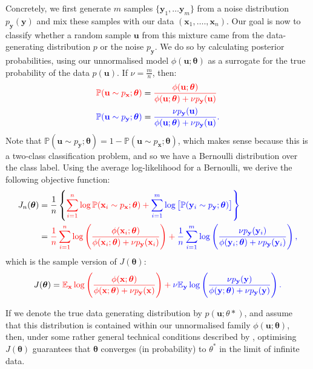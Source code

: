 \documentclass[11pt, oneside]{article}
\newcommand{\thetab}{{\boldsymbol{\theta}}}
\newcommand{\pnorm}{p}
\newcommand{\pnn}{\phi}
\newcommand{\pdata}{p_{ \mathbf x}}
\newcommand{\pnoise}{p_{ \mathbf y}}
\renewcommand{\u}{{\mathbf u}}
\newcommand{\x}{{\mathbf x}}
\newcommand{\y}{{\mathbf y}}
\renewcommand{\P}{\mathbb{P}}
\newcommand{\E}{\mathbb{E}}
\newcommand{\Ex}{\E_{\x}}
\newcommand{\Ey}{\E_{\y}}
\theoremstyle{definition}
\begin{document}
Concretely, we first generate $m$ samples $\{\textbf{y}_1, \ldots \textbf{y}_m\}$ from a noise distribution $\pnoise(\textbf{y})$ and mix these samples with our data $(\textbf{x}_1, …., \textbf{x}_n)$. Our goal is now to classify whether a random sample $\u$ from this mixture came from the data-generating distribution $p$ or the noise $\pnoise$. We do so by calculating posterior probabilities, using our unnormalised model $\phi(\u; \thetab)$ as a surrogate for the true probability of the data $p(\u)$. If $\nu = \frac{m}{n}$, then:
\begin{align}
    \color{red}{\P( \u \sim \pdata; \thetab)} &= \color{red}{\frac{\pnn(\textbf{u}; \thetab)}{\pnn(\textbf{u}; \thetab) + \nu \pnoise(\textbf{u})}} \\
    \color{blue}{\P( \u \sim \pnoise; \thetab)} &= \color{blue}{\frac{\nu \pnoise(\textbf{u})}{\pnn(\textbf{u}; \thetab) + \nu \pnoise(\textbf{u})}.}
\end{align}
Note that $\P( \u \sim \pnoise; \thetab ) = 1 - \P( \u \sim \pdata; \thetab )$, which makes sense because this is a two-class classification problem, and so we have a Bernoulli distribution over the class label. Using the average log-likelihood for a Bernoulli, we derive the following objective function:
\begin{align}
  J_n(\thetab)&= 
  \frac{1}{n} \left\{ \color{red}{\sum_{i=1}^{n} \log  \P( \x_i \sim \pdata; \thetab)} 
    + \color{blue}{\sum_{i=1}^{m} \log\left[\P( \y_i \sim \pnoise; \thetab )\right]} \right\} \\
  & = \color{red}{\frac{1}{n} \sum_{i=1}^{n} \log \left(\frac{\pnn(\x_i; \thetab)}{\pnn(\x_i; \thetab) + \nu \pnoise(\x_i)}\right)}
    + \color{blue}{\frac{1}{n}\sum_{i=1}^{m} \log \left(\frac{\nu \pnoise(\y_i)}{\pnn(\y_i; \thetab) + \nu \pnoise(\y_i)}\right),} 
  \label{eq:Jn}
\end{align}
which is the sample version of $J(\thetab)$:
\begin{equation}
  J(\thetab) = 
   \color{red}{\Ex  \log \left(\frac{\pnn(\x; \thetab)}{\pnn(\x; \thetab) + \nu \pnoise(\x)}\right)}
  + \color{blue}{\nu \Ey \log \left( \frac{\nu \pnoise(\y)}{\pnn(\y; \thetab) + \nu \pnoise(\y)}\right).}
  \label{eq:J}
\end{equation}

If we denote the true data generating distribution by $\pnorm(\u; \theta*)$, and assume that this distribution is contained within our unnormalised family $\phi(\u;\thetab)$, then, under some rather general technical conditions described by \citet{gutmann2012noise}, optimising $J(\thetab)$ guarantees that $\thetab$ converges (in probability) to $\theta^*$ in the limit of infinite data.
\end{document}
